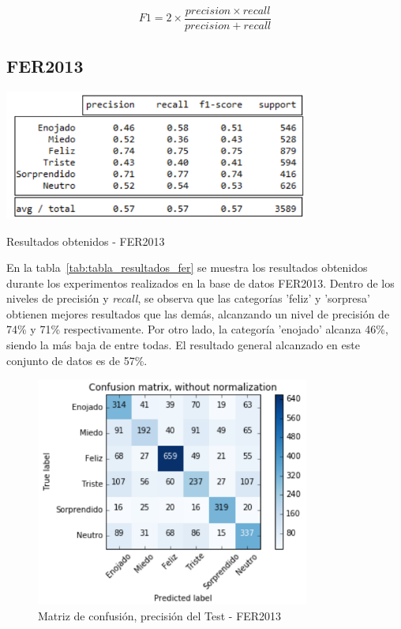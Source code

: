 \begin{equation}\label{eq:f1-score}
F1 = 2\times\frac{precision\times recall}{precision + recall}
\end{equation}

\subsection{FER2013}

\begin{table}[H]
    \centering
    \includegraphics[width=100mm]{Imagenes/tabla_resultados_fer.png} 
    \caption{Resultados obtenidos - FER2013}
    \label{tab:tabla_resultados_fer}
\end{table}

En la tabla~\ref{tab:tabla_resultados_fer} se muestra los resultados obtenidos durante los experimentos realizados en la base de datos FER2013. Dentro de los niveles de precisión y \textit{recall}, se observa que las categorías 'feliz' y 'sorpresa' obtienen mejores resultados que las demás, alcanzando un nivel de precisión de 74\% y 71\% respectivamente. Por otro lado, la categoría 'enojado' alcanza 46\%, siendo la más baja de entre todas. El resultado general alcanzado en este conjunto de datos es de 57\%.

\begin{figure}[H]
		\centering
		\includegraphics[width=90mm]{Imagenes/matriz_confusion_fer.png}
		\caption{Matriz de confusión, precisión del Test - FER2013}
		\label{fig:matriz_confusion_fer}
\end{figure}

